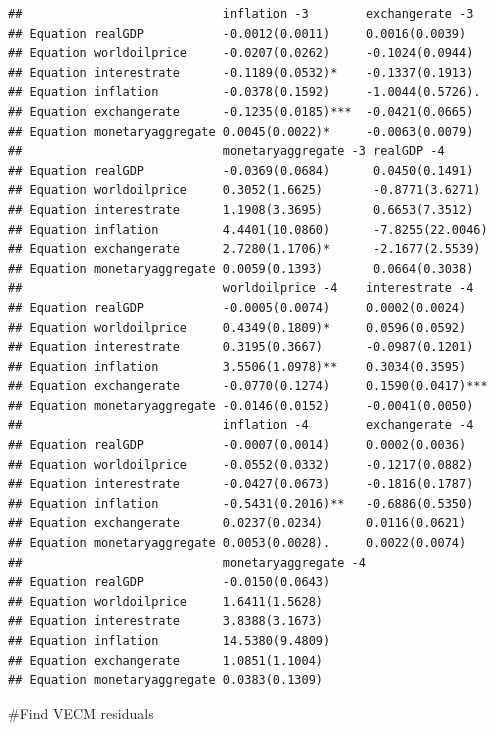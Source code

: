 \documentclass[11pt,preprint, authoryear]{elsarticle}
\numberwithin{equation}{section}
\numberwithin{figure}{section}
\numberwithin{table}{section}
\begin{document}
\begin{verbatim}
##                            inflation -3        exchangerate -3    
## Equation realGDP           -0.0012(0.0011)     0.0016(0.0039)     
## Equation worldoilprice     -0.0207(0.0262)     -0.1024(0.0944)    
## Equation interestrate      -0.1189(0.0532)*    -0.1337(0.1913)    
## Equation inflation         -0.0378(0.1592)     -1.0044(0.5726).   
## Equation exchangerate      -0.1235(0.0185)***  -0.0421(0.0665)    
## Equation monetaryaggregate 0.0045(0.0022)*     -0.0063(0.0079)    
##                            monetaryaggregate -3 realGDP -4          
## Equation realGDP           -0.0369(0.0684)      0.0450(0.1491)      
## Equation worldoilprice     0.3052(1.6625)       -0.8771(3.6271)     
## Equation interestrate      1.1908(3.3695)       0.6653(7.3512)      
## Equation inflation         4.4401(10.0860)      -7.8255(22.0046)    
## Equation exchangerate      2.7280(1.1706)*      -2.1677(2.5539)     
## Equation monetaryaggregate 0.0059(0.1393)       0.0664(0.3038)      
##                            worldoilprice -4    interestrate -4    
## Equation realGDP           -0.0005(0.0074)     0.0002(0.0024)     
## Equation worldoilprice     0.4349(0.1809)*     0.0596(0.0592)     
## Equation interestrate      0.3195(0.3667)      -0.0987(0.1201)    
## Equation inflation         3.5506(1.0978)**    0.3034(0.3595)     
## Equation exchangerate      -0.0770(0.1274)     0.1590(0.0417)***  
## Equation monetaryaggregate -0.0146(0.0152)     -0.0041(0.0050)    
##                            inflation -4        exchangerate -4    
## Equation realGDP           -0.0007(0.0014)     0.0002(0.0036)     
## Equation worldoilprice     -0.0552(0.0332)     -0.1217(0.0882)    
## Equation interestrate      -0.0427(0.0673)     -0.1816(0.1787)    
## Equation inflation         -0.5431(0.2016)**   -0.6886(0.5350)    
## Equation exchangerate      0.0237(0.0234)      0.0116(0.0621)     
## Equation monetaryaggregate 0.0053(0.0028).     0.0022(0.0074)     
##                            monetaryaggregate -4
## Equation realGDP           -0.0150(0.0643)     
## Equation worldoilprice     1.6411(1.5628)      
## Equation interestrate      3.8388(3.1673)      
## Equation inflation         14.5380(9.4809)     
## Equation exchangerate      1.0851(1.1004)      
## Equation monetaryaggregate 0.0383(0.1309)
\end{verbatim}

\#Find VECM residuals
\end{document}
